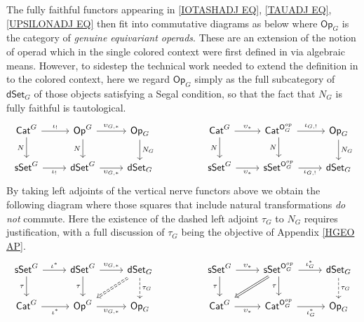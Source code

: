\documentclass[a4paper,10pt
,draft
]{article}%
\numberwithin{equation}{section}
\numberwithin{figure}{section}
\theoremstyle{definition} %
\newcommand{\1}{\ensuremath{\mathbbm 1}}%
\begin{document}
The fully faithful functors appearing in 
\eqref{IOTASHADJ EQ},
\eqref{TAUADJ EQ},
\eqref{UPSILONADJ EQ}
then fit into commutative diagrams
as below where $\mathsf{Op}_G$
is the category of \emph{genuine equivariant operads}.
These are an extension of the notion of operad
which in the single colored context were 
first defined in \cite{BP_geo}
via algebraic means. 
However, to sidestep the technical work needed to extend 
the definition in \cite{BP_geo} 
to the colored context,
here we regard $\mathsf{Op}_G$
simply as the full subcategory of 
$\mathsf{dSet}_G$
of those objects satisfying a Segal condition,
so that the fact that
$N_G$ is fully faithful is tautological.
\begin{equation}\label{ALLFULL EQ}
\begin{tikzcd}
	\mathsf{Cat}^G
	\ar{r}{\iota_!}
	\ar{d}[swap]{N}
	&
	\mathsf{Op}^G
	\ar{r}{\upsilon_{G,\**}}
	\ar{d}[swap]{N}
	&
	\mathsf{Op}_G
	\ar{d}{N_G}
&&
	\mathsf{Cat}^G
	\ar{r}{\upsilon_{\**}}
	\ar{d}[swap]{N}
	&
	\mathsf{Cat}^{\mathsf{O}_G^{op}}
	\ar{r}{\iota_{G,!}}
	\ar{d}[swap]{N}
	&
	\mathsf{Op}_G
	\ar{d}{N_G}
\\
	\mathsf{sSet}^G
	\ar{r}[swap]{\iota_!}
	&
	\mathsf{dSet}^G
	\ar{r}[swap]{\upsilon_{G,\**}}
	&
	\mathsf{dSet}_G
	&&
	\mathsf{sSet}^G
	\ar{r}[swap]{\upsilon_{\**}}
	&
	\mathsf{sSet}^{\mathsf{O}_G^{op}}
	\ar{r}[swap]{\iota_{G,!}}
	&
\mathsf{dSet}_G
\end{tikzcd}
\end{equation}
By taking left adjoints of 
the vertical nerve functors above 
we obtain the following diagram
where those squares that include natural transformations
\emph{do not} commute. 
Here the existence of the dashed left adjoint 
$\tau_G$ to $N_G$
requires justification, 
with a full discussion of $\tau_G$
being the objective of Appendix \ref{HGEO AP}.
\begin{equation}\label{TAUFUNCTS EQ}
\begin{tikzcd}
	\mathsf{sSet}^G
	\ar{r}{\iota^{\**}}
	\ar{d}[swap]{\tau}
	&
	\mathsf{dSet}^G
	\ar{r}{\upsilon_{G,\**}}
	\ar{d}[swap]{\tau}
	&
	\mathsf{dSet}_G
	\ar[dashed]{d}{\tau_G}
	\ar[Rightarrow,dashed]{dl}
&&
	\mathsf{sSet}^G
	\ar{r}{\upsilon_{\**}}
	\ar{d}[swap]{\tau}
	&
	\mathsf{sSet}^{\mathsf{O}_G^{op}}
	\ar{r}{\iota^{\**}_G}
	\ar{d}[swap]{\tau}
	\ar[Rightarrow]{dl}
	&
	\mathsf{dSet}_G
	\ar[dashed]{d}{\tau_G}
\\
	\mathsf{Cat}^G
	\ar{r}[swap]{\iota^{\**}}
	&
	\mathsf{Op}^G
	\ar{r}[swap]{\upsilon_{G,\**}}
	&
	\mathsf{Op}_G
&&
	\mathsf{Cat}^G
	\ar{r}[swap]{\upsilon_{\**}}
	&
	\mathsf{Cat}^{\mathsf{O}_G^{op}}
	\ar{r}[swap]{\iota_{G}^{\**}}
	&
	\mathsf{Op}_G
\end{tikzcd}
\end{equation}
\end{document}
